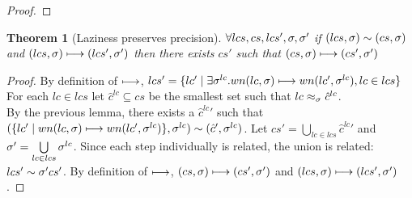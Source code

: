 \documentclass[preprint,onecolumn,9pt]{sigplanconf} %
\newtheorem{theorem}{Theorem}
\begin{document}
\begin{proof}
\end{proof}


\begin{theorem}[Laziness preserves precision]
$\forall lcs,cs,lcs',\sigma,\sigma'$ if $(lcs, \sigma) \sim (cs,\sigma)$
  and $(lcs,\sigma) \longmapsto (lcs',\sigma')$ then there exists $cs'$
  such that $(cs,\sigma) \longmapsto (cs',\sigma')$
\end{theorem}
\begin{proof}
By definition of $\longmapsto$,
$lcs' = \{lc' \mid \exists \sigma^{lc}. wn(lc,\sigma) \longmapsto wn(lc', \sigma^{lc}), lc \in lcs\}$
For each $lc \in lcs$ let $\hat{c}^{lc} \subseteq cs$ be the
smallest set such that $lc \approx_{\sigma} \hat{c}^{lc}$. \\ By the
previous lemma, there exists a $\hat{c}^{lc}{}'$ such that $(\{lc' \mid wn(lc,\sigma) \longmapsto
  wn(lc', \sigma^{lc})\}, \sigma^{lc}) \sim (\hat{c}',\sigma^{lc})$. Let
$cs' = \bigcup\limits_{lc \in lcs}{\hat{c}^{lc}{}'}$ and $\sigma' = \bigcup\limits_{lc \in lcs}{\sigma^{lc}}$.
Since each step individually is related, the union is related: $lcs' \sim \sigma'{cs'}$.
By definition of $\longmapsto$, $(cs, \sigma) \longmapsto (cs', \sigma')$ and $(lcs, \sigma) \longmapsto (lcs', \sigma')$.
\end{proof}
\end{document}
